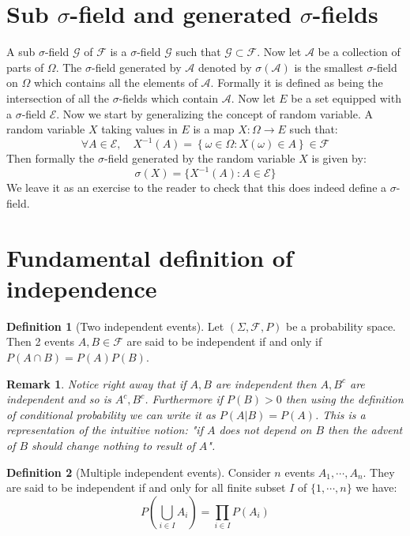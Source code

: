 \documentclass[10pt,a4paper]{book}
\newtheorem*{remark}{Remark}
\theoremstyle{definition}
\newtheorem{definition}{Definition}[section]
\begin{document}
\section{Sub $\sigma$-field and generated $\sigma$-fields}
A sub $\sigma$-field  $\mathcal{G}$ of $\mathcal{F}$ is a $\sigma$-field $\mathcal{G}$ such that $\mathcal{G} \subset \mathcal{F}$. Now let $\mathcal{A}$ be a collection of parts of $\Omega$. The $\sigma$-field generated by $\mathcal{A}$ denoted by $\sigma(\mathcal{A})$ is the smallest $\sigma$-field on $\Omega$ which contains all the elements of $\mathcal{A}$. Formally it is defined as being the intersection of all the $\sigma$-fields which contain $\mathcal{A}$. Now let $E$ be a set equipped with a $\sigma$-field $\mathcal{E}$. Now we start by generalizing the concept of random variable. A random variable $X$ taking values in $E$ is a map $X : \Omega \to E$ such that:
\[
\forall A \in \mathcal{E}, \quad X^{-1}(A) = \left\{ \omega \in \Omega : X(\omega) \in A \right\} \in \mathcal{F}
\] 
Then formally the $\sigma$-field generated by the random variable $X$ is given by:
\[
\sigma(X) = \{ X^{-1}(A) : A \in \mathcal{E}\}
\]
We leave it as an exercise to the reader to check that this does indeed define a $\sigma$-field.

\section{Fundamental definition of independence}

\begin{definition}[Two independent events]
Let $(\Sigma, \mathcal{F}, P)$ be a probability space. Then 2 events $A, B \in \mathcal{F}$ are said to be independent if and only if $P(A \cap B) = P(A) P(B)$. 
\end{definition}

\begin{remark}
Notice right away that if $A, B$ are independent then $A, B^c$ are independent and so is $A^c, B^c$. Furthermore if $P(B) > 0$ then using the definition of conditional probability we can write it as $P(A | B) = P(A)$. This is a representation of the intuitive notion: "if $A$ does not depend on $B$ then the advent of $B$ should change nothing to result of $A$".  
\end{remark}

\begin{definition} [Multiple independent events] \label{indp:events} Consider $n$ events $A_1, \cdots, A_n$. They are said to be independent if and only for all finite subset $I$ of $\{1, \cdots, n\}$ we have:
\[
P\left( \bigcup_{i \in I} A_i \right) = \prod_{i \in I} P(A_i)
\]
\end{definition}
\end{document}
